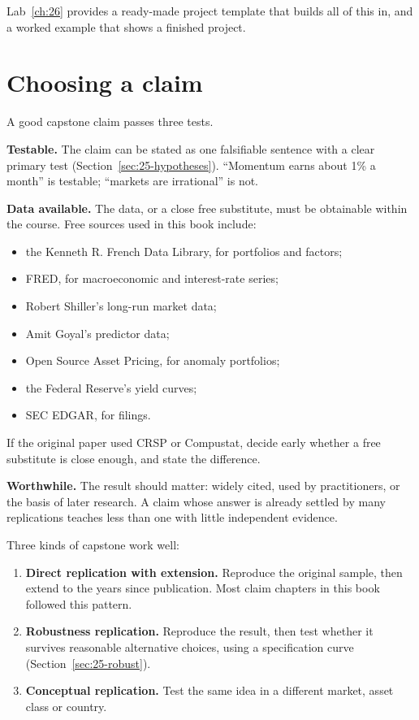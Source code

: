 Lab~\ref{ch:26} provides a ready-made project template that builds all of this in, and a worked example that shows a finished project.

\section{Choosing a claim}
\label{sec:26-choosing}

A good capstone claim passes three tests.

\textbf{Testable.} The claim can be stated as one falsifiable sentence with a clear primary test (Section~\ref{sec:25-hypotheses}). ``Momentum earns about 1\% a month'' is testable; ``markets are irrational'' is not.

\textbf{Data available.} The data, or a close free substitute, must be obtainable within the course. Free sources used in this book include:

\begin{itemize}
  \item the Kenneth R. French Data Library, for portfolios and factors;
  \item FRED, for macroeconomic and interest-rate series;
  \item Robert Shiller's long-run market data;
  \item Amit Goyal's predictor data;
  \item Open Source Asset Pricing, for anomaly portfolios;
  \item the Federal Reserve's yield curves;
  \item SEC EDGAR, for filings.
\end{itemize}

If the original paper used CRSP or Compustat, decide early whether a free substitute is close enough, and state the difference.

\textbf{Worthwhile.} The result should matter: widely cited, used by practitioners, or the basis of later research. A claim whose answer is already settled by many replications teaches less than one with little independent evidence.

Three kinds of capstone work well:

\begin{enumerate}
  \item \textbf{Direct replication with extension.} Reproduce the original sample, then extend to the years since publication. Most claim chapters in this book followed this pattern.
  \item \textbf{Robustness replication.} Reproduce the result, then test whether it survives reasonable alternative choices, using a specification curve (Section~\ref{sec:25-robust}).
  \item \textbf{Conceptual replication.} Test the same idea in a different market, asset class or country.
\end{enumerate}

